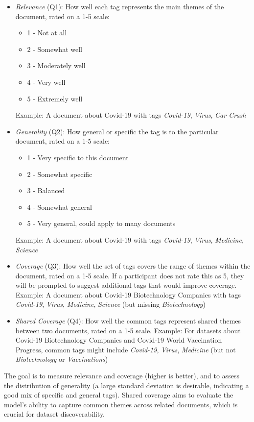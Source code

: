 \begin{itemize}
\item \textit{Relevance} (Q1): How well each tag represents the main themes of the document, rated on a 1-5 scale:
\begin{itemize}
\item 1 - Not at all
\item 2 - Somewhat well
\item 3 - Moderately well
\item 4 - Very well
\item 5 - Extremely well
\end{itemize}
Example: A document about Covid-19 with tags \textit{Covid-19}, \textit{Virus}, \textit{Car Crash}

\item \textit{Generality} (Q2): How general or specific the tag is to the particular document, rated on a 1-5 scale:
\begin{itemize}
\item 1 - Very specific to this document
\item 2 - Somewhat specific
\item 3 - Balanced
\item 4 - Somewhat general
\item 5 - Very general, could apply to many documents
\end{itemize}
Example: A document about Covid-19 with tags \textit{Covid-19}, \textit{Virus}, \textit{Medicine}, \textit{Science}

\item \textit{Coverage} (Q3): How well the set of tags covers the range of themes within the document, rated on a 1-5 scale. If a participant does not rate this as 5, they will be prompted to suggest additional tags that would improve coverage.
Example: A document about Covid-19 Biotechnology Companies with tags \textit{Covid-19}, \textit{Virus}, \textit{Medicine}, \textit{Science} (but missing \textit{Biotechnology})

\item \textit{Shared Coverage} (Q4): How well the common tags represent shared themes between two documents, rated on a 1-5 scale.
Example: For datasets about Covid-19 Biotechnology Companies and Covid-19 World Vaccination Progress, common tags might include \textit{Covid-19}, \textit{Virus}, \textit{Medicine} (but not \textit{Biotechnology} or \textit{Vaccinations})
\end{itemize}

The goal is to measure relevance and coverage (higher is better), and to assess the distribution of generality (a large standard deviation is desirable, indicating a good mix of specific and general tags). Shared coverage aims to evaluate the model's ability to capture common themes across related documents, which is crucial for dataset discoverability.

